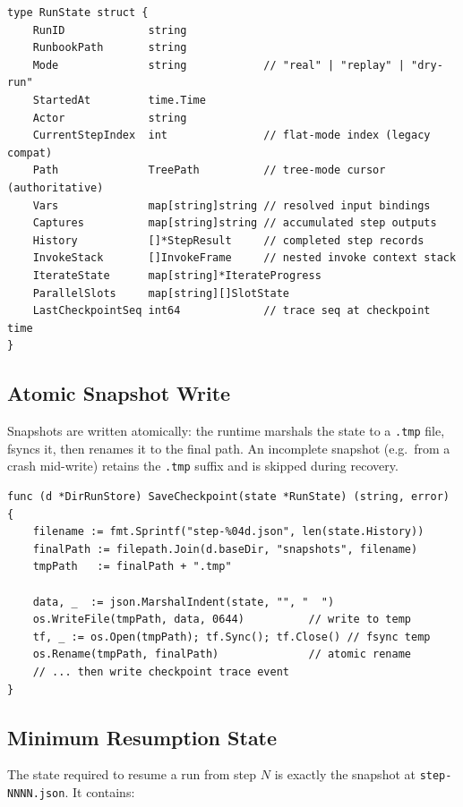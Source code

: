 \begin{verbatim}
type RunState struct {
    RunID             string
    RunbookPath       string
    Mode              string            // "real" | "replay" | "dry-run"
    StartedAt         time.Time
    Actor             string
    CurrentStepIndex  int               // flat-mode index (legacy compat)
    Path              TreePath          // tree-mode cursor (authoritative)
    Vars              map[string]string // resolved input bindings
    Captures          map[string]string // accumulated step outputs
    History           []*StepResult     // completed step records
    InvokeStack       []InvokeFrame     // nested invoke context stack
    IterateState      map[string]*IterateProgress
    ParallelSlots     map[string][]SlotState
    LastCheckpointSeq int64             // trace seq at checkpoint time
}
\end{verbatim}

\subsection{Atomic Snapshot Write}

Snapshots are written atomically: the runtime marshals the state to a \texttt{.tmp} file, fsyncs it, then renames it to the final path. An incomplete snapshot (e.g.\ from a crash mid-write) retains the \texttt{.tmp} suffix and is skipped during recovery.

\begin{verbatim}
func (d *DirRunStore) SaveCheckpoint(state *RunState) (string, error) {
    filename := fmt.Sprintf("step-%04d.json", len(state.History))
    finalPath := filepath.Join(d.baseDir, "snapshots", filename)
    tmpPath   := finalPath + ".tmp"

    data, _  := json.MarshalIndent(state, "", "  ")
    os.WriteFile(tmpPath, data, 0644)          // write to temp
    tf, _ := os.Open(tmpPath); tf.Sync(); tf.Close() // fsync temp
    os.Rename(tmpPath, finalPath)              // atomic rename
    // ... then write checkpoint trace event
}
\end{verbatim}

\subsection{Minimum Resumption State}

The state required to resume a run from step $N$ is exactly the snapshot at \texttt{step-NNNN.json}. It contains:

